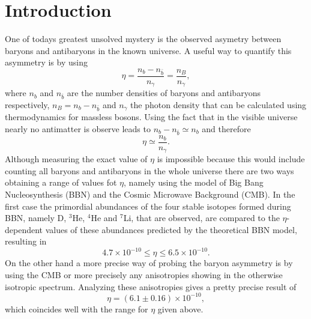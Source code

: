 \chapter{Introduction}
One of todays greatest unsolved mystery is the observed asymetry between baryons and antibaryons in the known universe. A useful way to quantify this asymmetry is by using
\begin{equation}
	\eta=\frac{n_b-n_{\bar{b}}}{n_\gamma}=\frac{n_B}{n_\gamma},
	\label{eq:asymmetry}
\end{equation}
where $n_b$ and $n_{\bar{b}}$ are the number densities of baryons and antibaryons respectively, $n_B=n_b-n_{\bar{b}}$ and $n_\gamma$ the photon density that can be calculated using thermodynamics for massless bosons. Using the fact that in the visible universe nearly no antimatter is observe leads to $n_b-n_{\bar{b}}\simeq n_b$ and therefore
\begin{equation}
\eta\simeq\frac{n_b}{n_\gamma}.
\end{equation}\newline \indent
Although measuring the exact value of $\eta$ is impossible because this would include counting all baryons and antibaryons in the whole universe there are two ways obtaining a range of values fot $\eta$, namely using the model of Big Bang Nucleosynthesis (BBN) and the Cosmic Microwave Background (CMB)\cite{Sarkar:2002er}. In the first case the primordial abundances of the four stable isotopes formed during BBN, namely D, $^3$He, $^4$He and $^7$Li, that are observed, are compared to the $\eta$-dependent values of these abundances predicted by the theoretical BBN model, resulting in 
\cite[Eq. (1.25)]{Biondini:2016hhn}
\begin{equation}
	4.7\times10^{-10}\leq\eta\leq6.5\times10^{-10}.
\end{equation}
On the other hand a more precise way of probing the baryon asymmetry is by using the CMB or more precisely any anisotropies showing in the otherwise isotropic spectrum. Analyzing these anisotropies gives a pretty precise result of \cite[Eq. (1.26)]{Biondini:2016hhn}
\begin{equation}
\eta=(6.1\pm0.16)\times10^{-10},
\label{eq:eta_value}
\end{equation}
which coincides well with the range for $\eta$ given above.\newline \indent
